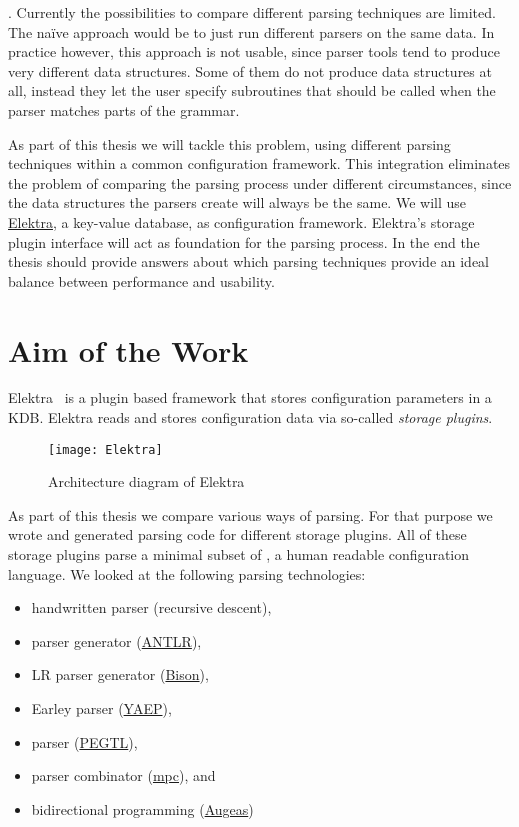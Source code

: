 . Currently the possibilities to compare different parsing techniques are limited. The naïve approach would be to just run different parsers on the same data. In practice however, this approach is not usable, since parser tools tend to produce very different data structures. Some of them do not produce data structures at all, instead they let the user specify subroutines that should be called when the parser matches parts of the grammar.

As part of this thesis we will tackle this problem, using different parsing techniques within a common configuration framework. This integration eliminates the problem of comparing the parsing process under different circumstances, since the data structures the parsers create will always be the same. We will use \href{http://web.libelektra.org}{Elektra}, a key-value database, as configuration framework. Elektra’s storage plugin interface will act as foundation for the parsing process. In the end the thesis should provide answers about which parsing techniques provide an ideal balance between performance and usability.

\section{Aim of the Work}
\label{sec:aim_of_the_work}

Elektra~\cite{raab2010modular, raab2017context} is a plugin based framework that stores configuration parameters in a \gls{KDB}. Elektra reads and stores configuration data via so-called \emph{storage plugins}.

\begin{figure}[H]
  \centering
    \texttt{[image: Elektra]}
  \caption{Architecture diagram of Elektra}
\end{figure}

As part of this thesis we compare various ways of parsing. For that purpose we wrote and generated parsing code for different storage plugins. All of these storage plugins parse a minimal subset of , a human readable configuration language. We looked at the following parsing technologies:

\begin{itemize}
  \item handwritten parser (recursive descent),
  \item {} parser generator (\href{http://www.antlr.org}{ANTLR}),
  \item LR parser generator (\href{https://www.gnu.org/software/bison}{Bison}),
  \item Earley parser (\href{https://github.com/vnmakarov/yaep}{YAEP}),
  \item {} parser (\href{https://github.com/taocpp/PEGTL}{PEGTL}),
  \item parser combinator (\href{https://github.com/orangeduck/mpc}{mpc}), and
  \item bidirectional programming (\href{http://augeas.net}{Augeas})
\end{itemize}

